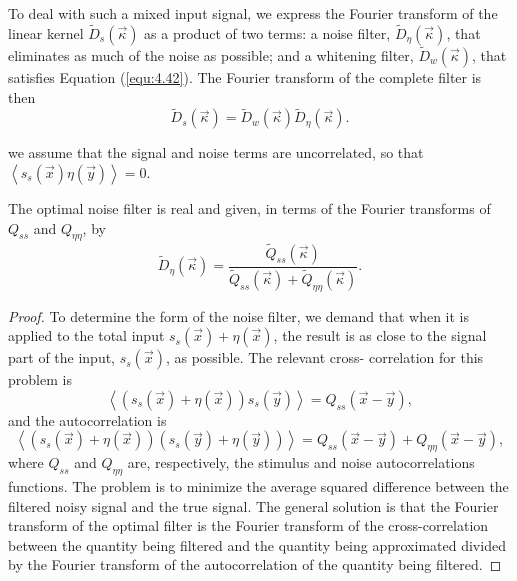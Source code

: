 \begin{thm}
  To deal with such a mixed input
signal, we express the Fourier transform of the linear kernel
$\tilde{D}_s(\vec{\kappa})$ as a product of two terms: a noise filter,
$\tilde{D}_{\eta}(\vec{\kappa})$, that eliminates as much of the
noise as possible; and a whitening filter,
$\tilde{D}_{w}(\vec{\kappa})$, that satisfies Equation (\ref{equ:4.42}).
The Fourier transform of the complete filter is then
\begin{equation}
  \label{equ:linear kernel}
  \tilde{D}_s(\vec{\kappa})=\tilde{D}_{w}(\vec{\kappa})\tilde{D}_{\eta}(\vec{\kappa}).
\end{equation}
\end{thm}

\begin{asm}
  we assume that the signal and noise
terms are uncorrelated, so that $\left\langle s_s(\vec{x})\eta(\vec{y}) \right\rangle=0$.
\end{asm}

\begin{thm}
  The optimal noise filter is real and
given, in terms of the Fourier transforms of $Q_{ss}$ and
$Q_{\eta\eta}$, by
\begin{equation}
  \label{equ:4.46}
  \tilde{D}_{\eta}(\vec{\kappa}) = \frac{\tilde{Q}_{ss}(\vec{\kappa})}{\tilde{Q}_{ss}(\vec{\kappa}) + \tilde{Q}_{\eta\eta}(\vec{\kappa})}.
\end{equation}
\begin{proof}
    To determine the form of the noise filter, we demand that when it is applied to the total input $s_{s}(\vec{x})+\eta(\vec{x})$, the result is
as close to the signal part of the input, $s_{s}(\vec{x})$, as
possible.
  The relevant cross-
  correlation for this problem is
\begin{equation}
  \label{equ:4.44}
  \left\langle (s_{s}(\vec{x})+\eta(\vec{x}))s_{s}(\vec{y}) \right\rangle = Q_{ss}(\vec{x}-\vec{y}),
\end{equation}
and the autocorrelation is
\begin{equation}
  \label{equ:4.45}
  \left\langle (s_{s}(\vec{x})+\eta(\vec{x}))(s_{s}(\vec{y}) + \eta(\vec{y}))\right\rangle = Q_{ss}(\vec{x}-\vec{y}) + Q_{\eta \eta}(\vec{x}-\vec{y}),
\end{equation}
where $Q_{ss}$ and $Q_{\eta\eta}$ are, respectively, the stimulus and noise autocorrelations functions.
 The problem is to minimize the average
squared difference between the filtered noisy signal and the true
signal. The general solution is that the Fourier transform of the optimal filter is the
Fourier transform of the cross-correlation between the quantity being filtered and the quantity being approximated divided by the Fourier transform of the autocorrelation of the quantity being filtered.
\end{proof}
\end{thm}


